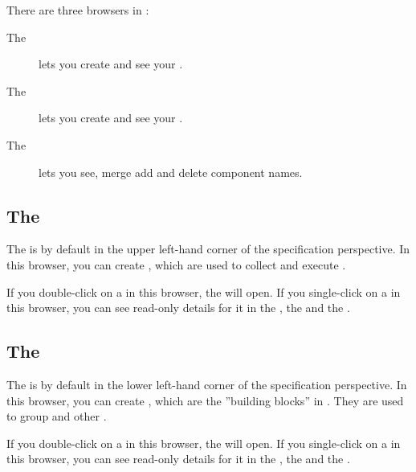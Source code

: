 
There are three browsers in \jb{}:
\begin{description}
\item[The \gdtestcasebrowser{}]{ lets you create and see your \gdcases{}. }
\item[The \gdtestsuitebrowser{}]{ lets you create and see your \gdsuites{}.}
\item [The \gdcompnamebrowser{}]{lets you see, merge add and delete component names.}
\end{description}

\subsection{The \gdtestsuitebrowser{}}
The \gdtestsuitebrowser{} is by default in the upper left-hand corner of the specification perspective. In this browser, you can create \gdsuites{}, which are used to collect and execute \gdcases{}. 

If you double-click on a \gdsuite{} in this browser, the \gdtestsuiteeditor{} will open. 
If you single-click on a \gdsuite{} in this browser, you can see read-only details for it in the \gdpropview{}, the \gddatasetsview{} and the \gdcompnamesview{}.  

\subsection{The \gdtestcasebrowser{}}

The \gdtestcasebrowser{} is by default in the lower left-hand corner of the specification perspective. In this browser, you can create \gdcases{}, which are the ''building blocks'' in \jb{}. They are used to group \gdsteps{} and other \gdcases{}.  

If you double-click on a \gdcase{} in this browser, the \gdtestcaseeditor{} will open. 
If you single-click on a \gdcase{} in this browser, you can see read-only details for it in the \gdpropview{}, the \gddatasetsview{} and the \gdcompnamesview{}.  


